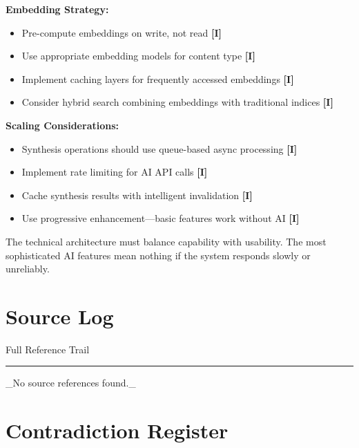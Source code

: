 \documentclass[a4paper,11pt]{article}
\newcommand{\ssubtitle}[1]{%
  \par\textcolor{subtitle}{\fontsize{12}{16}\selectfont #1}%
  \par\vspace{2pt}\textcolor{border}{\rule{\linewidth}{0.4pt}}\vspace{12pt}%
}
\newcommand{\ilabel}{\textbf{\textcolor{icolor}{[I]}}}
\begin{document}
\textbf{Embedding Strategy:}\par
\begin{itemize}
  \item Pre-compute embeddings on write, not read \ilabel{}
  \item Use appropriate embedding models for content type \ilabel{}
  \item Implement caching layers for frequently accessed embeddings \ilabel{}
  \item Consider hybrid search combining embeddings with traditional indices \ilabel{}
\end{itemize}

\textbf{Scaling Considerations:}\par
\begin{itemize}
  \item Synthesis operations should use queue-based async processing \ilabel{}
  \item Implement rate limiting for AI API calls \ilabel{}
  \item Cache synthesis results with intelligent invalidation \ilabel{}
  \item Use progressive enhancement—basic features work without AI \ilabel{}
\end{itemize}

The technical architecture must balance capability with usability. The most sophisticated AI features mean nothing if the system responds slowly or unreliably.

\clearpage
\section{Source Log}
\ssubtitle{Full Reference Trail}

\_No source references found.\_



\section{Contradiction Register}
\end{document}
